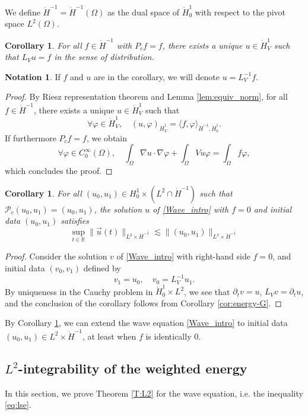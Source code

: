 \documentclass[10pt,leqno]{amsart}
\newtheorem{corollary}[theorem]{Corollary}
\theoremstyle{definition}%
\newtheorem{notation}[theorem]{Notation}
\theoremstyle{remark}
\numberwithin{equation}{section}
\newcommand{\R}{\mathbb{R}}
\renewcommand{\^}{\widehat}%
\newcommand{\PPP}{\mathcal{P}}
\begin{document}
We define $\dot{H}^{-1}=\dot{H}^{-1}(\Omega)$ as the dual space of $\dot{H}^{1}_0$ with respect to the pivot space $L^2(\Omega)$.
\begin{corollary}
 \label{cor:H-1}
For all $f\in \dot{H}^{-1}$ with $P_cf=f$, there exists a unique $u\in \dot{H}^1_V$ such that $L_V u=f$ in the sense of distribution.
 \end{corollary}
\begin{notation}
 If $f$ and $u$ are in the corollary, we will denote $u=L_V^{-1}f$.
\end{notation}
\begin{proof}
 By Riesz representation theorem and Lemma \ref{lem:equiv_norm}, for all $f\in \dot{H}^{-1}$, there exists a unique $u\in \dot{H}^1_V$ such that 
 $$ \forall \varphi\in \dot{H}^1_V,\quad (u,\varphi)_{\dot{H}^1_V}=\langle f,\varphi\rangle_{\dot{H}^{-1},\dot{H}^1_0}.$$
 If furthermore $P_cf= f$, we obtain
 $$\forall \varphi\in C^{\infty}_0(\Omega), \quad \int_{\Omega} \nabla u\cdot\nabla \varphi+\int_{\Omega}V u\varphi=\int_{\Omega} f\varphi,$$
 which concludes the proof.
\end{proof}
\begin{corollary}
\label{cor:H-1_wave}
For all $(u_0,u_1)\in H^1_0\times (L^2\cap \dot{H}^{-1})$ such that $\PPP_c(u_0,u_1)=(u_0,u_1)$, the solution $u$ of \eqref{Wave_intro} with $f=0$ and initial data $(u_0,u_1)$ satisfies
$$\sup_{t\in \R} \|\vec{u}(t)\|_{L^2\times \dot{H}^{-1}}\lesssim \|(u_0,u_1)\|_{L^2\times\dot{H}^{-1}}$$
\end{corollary}
\begin{proof}
 Consider the solution $v$ of \eqref{Wave_intro} with right-hand side $f=0$, and initial data $(v_0,v_1)$ defined by 
 $$ v_1=u_0,\quad v_0=L_V^{-1}u_1.$$
 By uniqueness in the Cauchy problem in $\dot{H}^1_0\times L^2$, we see that $\partial_tv=u$, $L_Vv=\partial_tu$, and the conclusion of the corollary follows from Corollary \ref{cor:energy-G}.  
\end{proof}
By Corollary \ref{cor:H-1_wave}, we can extend the wave equation \eqref{Wave_intro} to initial data $(u_0,u_1)\in L^2\times \dot{H}^{-1}$, at least when $f$ is identically $0$.
\subsection{$L^2$-integrability of the weighted energy}

\label{sub:L2wave}

In this section, we prove Theorem \ref{T:L2} for the wave equation, i.e. the inequality \eqref{eq:lse}.
\end{document}
